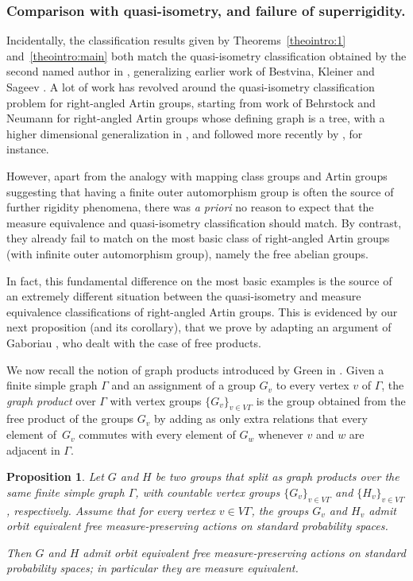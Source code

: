 \documentclass[11pt]{article}
\numberwithin{equation}{section}
\theoremstyle{plain}
\newtheorem{propintro}[theointro]{Proposition}
\theoremstyle{definition}
\begin{document}
\subsubsection*{Comparison with quasi-isometry, and failure of superrigidity.} Incidentally, the classification results given by Theorems~\ref{theointro:1} and~\ref{theointro:main} both match the quasi-isometry classification obtained by the second named author in \cite{Hua}, generalizing earlier work of Bestvina, Kleiner and Sageev \cite{BKS}. A lot of work has revolved around the quasi-isometry classification problem for right-angled Artin groups, starting from work of Behrstock and Neumann \cite{behrstock2008quasi} for right-angled Artin groups whose defining graph is a tree, with a higher dimensional generalization in \cite{behrstock2010quasi}, and followed more recently by \cite{Hua4,Mar}, for instance.

However, apart from the analogy with mapping class groups and Artin groups suggesting that having a finite outer automorphism group is often the source of further rigidity phenomena, there was \emph{a priori} no reason to expect that the measure equivalence and quasi-isometry classification should match. By contrast, they already fail to match on the most basic class of right-angled Artin groups (with infinite outer automorphism group), namely the free abelian groups.

In fact, this fundamental difference on the most basic examples is the source of an extremely different situation between the quasi-isometry and measure equivalence classifications of right-angled Artin groups. This is evidenced by our next proposition (and its corollary), that we prove by adapting an argument of Gaboriau \cite{Gab-cost,Gab}, who dealt with the case of free products.

We now recall the notion of graph products introduced by Green in \cite{green1990graph}. Given a finite simple graph $\Gamma$ and an assignment of a group $G_v$ to every vertex $v$ of $\Gamma$, the \emph{graph product} over $\Gamma$ with vertex groups $\{G_v\}_{v\in V\Gamma}$ is the group obtained from the free product of the groups $G_v$ by adding as only extra relations that every element of~$G_v$ commutes with every element of $G_w$ whenever $v$ and $w$ are adjacent in $\Gamma$.

\begin{propintro}\label{propintro:graph-products}
Let $G$ and $H$ be two groups that split as graph products over the same finite simple graph $\Gamma$, with countable vertex groups $\{G_v\}_{v\in V\Gamma}$ and $\{H_v\}_{v\in V\Gamma}$, respectively. Assume that for every vertex $v\in V\Gamma$, the groups $G_v$ and $H_v$ admit orbit equivalent free measure-preserving actions on standard probability spaces.

Then $G$ and $H$ admit orbit equivalent free measure-preserving actions on standard probability spaces; in particular they are measure equivalent.
\end{propintro}
\end{document}
